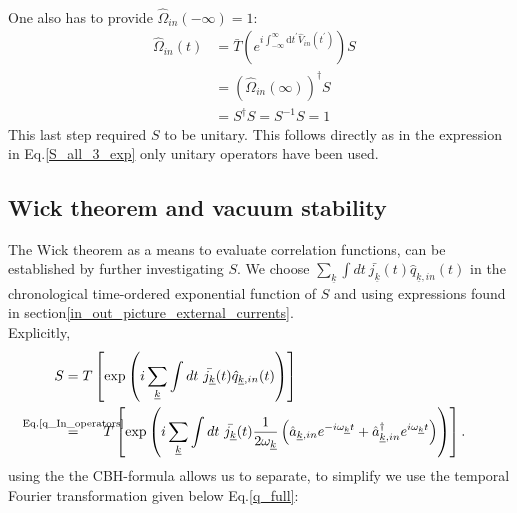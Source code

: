 \documentclass[12pt, titlepage]{article}
\begin{document}
\\
One also has to provide $ \hat{\Omega}_{in}(-\infty)= 1 $:
\begin{subequations}
\begin{align}
\hat{\Omega}_{in}(t)
	&=\bar{T}
	\left( 
	 e^{i\int_{-\infty}^{\infty}\mathrm{d}t^{\prime} \hat{V}_{in}(t^{\prime})}
	\right) S
	&\\
	&=
	(\hat{\Omega}_{in}(\infty))^{\dagger}S
	&\\
	&=S^{\dagger}S=S^{-1}S=1
\end{align}
\end{subequations}
This last step required $ S $ to be unitary. This follows directly as in the expression in Eq.\enskip\eqref{S_all_3_exp} only unitary operators have been used.
\subsection{Wick theorem and vacuum stability}\label{Vacuum_transition}
The Wick theorem as a means to evaluate correlation functions, can be established by further investigating $ S $. We choose $ \sum_{\underline{k}}\int dt \ \bar{j_{\underline{k}}}(t) \hat{q}_{\underline{k},in}(t) $ in the chronological time-ordered exponential function of $ S $ and using expressions found in section\enskip\ref{in_out_picture_external_currents}.\\
Explicitly,
\begin{subequations}\label{S_start_wick}
\begin{align}
	S &=
	T\left[
    \exp
    \left(
    i
    \sum_{\underline{k}}\int dt \ \bar{j_{\underline{k}}}(t) \hat{q}_{\underline{k},in}(t) 
    \right)
    \right]  
   \\
   &\stackrel{\mathclap{\text{Eq.\text{\eqref{q_In_operators}}}}}{=} \hspace*{1.5em} 
   T\left[
   \exp
   \left(
       i
    \sum_{\underline{k}}\int dt \ \bar{j_{\underline{k}}}(t)
     \dfrac{1}{2\omega_{\underline{k}}}\left(
	\hat{a}_{\underline{k},in} 
	e^{-i\omega_{\underline{k}}t}
	+
	\hat{a}^{\dagger}_{\underline{k},in}  
	e^{i\omega_{\underline{k}}t}
  \right)
   \right)
   \right]   
   .
\end{align}
\end{subequations}
using the the CBH-formula allows us to separate, to simplify we use the temporal Fourier transformation given below Eq.\enskip\eqref{q_full}:
\end{document}
